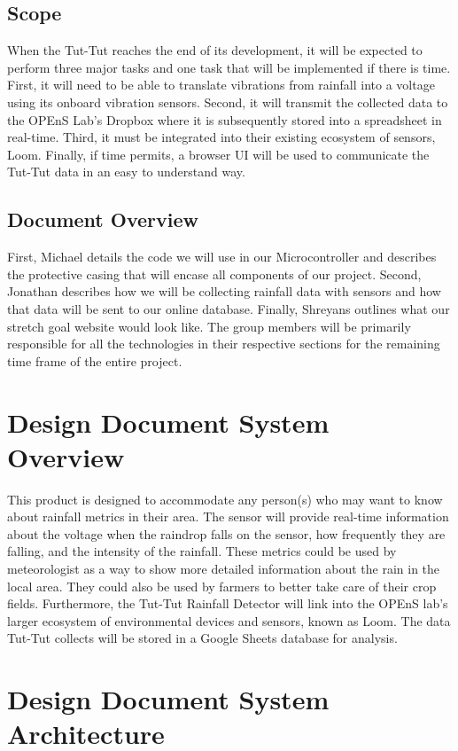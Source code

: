 \documentclass[letterpaper,10pt,draftclsnofoot,onecolumn]{article}
\begin{document}
\subsection{Scope}
When the Tut-Tut reaches the end of its development, it will be expected to perform three major tasks and one task that will be implemented if there is time. First, it will need to be able to translate vibrations from rainfall into a voltage using its onboard vibration sensors. Second, it will transmit the collected data to the OPEnS Lab's Dropbox where it is subsequently stored into a spreadsheet in real-time. Third, it must be integrated into their existing ecosystem of sensors, Loom. Finally, if time permits, a browser UI will be used to communicate the Tut-Tut data in an easy to understand way.

\subsection{Document Overview}
First, Michael details the code we will use in our Microcontroller and describes the protective casing that will encase all components of our project. Second, Jonathan describes how we will be collecting rainfall data with sensors and how that data will be sent to our online database. Finally, Shreyans outlines what our stretch goal website would look like. The group members will be primarily responsible for all the technologies in their respective sections for the remaining time frame of the entire project.

\section{Design Document System Overview}
This product is designed to accommodate any person(s) who may want to know about rainfall metrics in their area. The sensor will provide real-time information about the voltage when the raindrop falls on the sensor, how frequently they are falling, and the intensity of the rainfall. These metrics could be used by meteorologist as a way to show more detailed information about the rain in the local area. They could also be used by farmers to better take care of their crop fields. Furthermore, the Tut-Tut Rainfall Detector will link into the OPEnS lab's larger ecosystem of environmental devices and sensors, known as Loom. The data Tut-Tut collects will be stored in a Google Sheets database for analysis.

\section{Design Document System Architecture}
\end{document}
